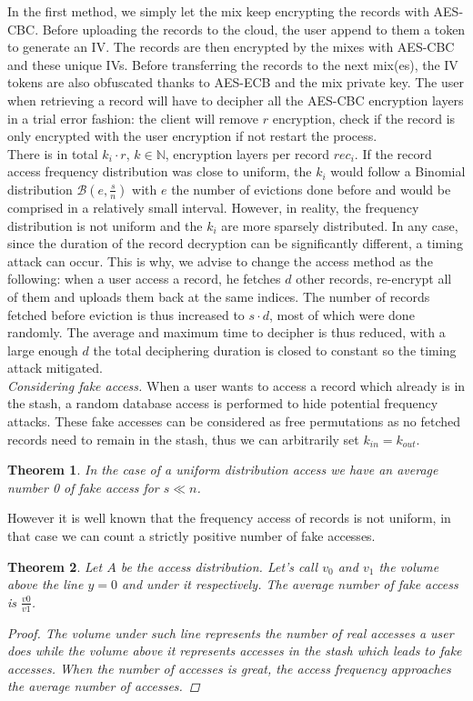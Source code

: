 \documentclass{llncs}
\newtheorem{thm}{Theorem}
\begin{document}
In the first method, we simply let the mix keep encrypting the records with AES-CBC. Before uploading the records to the cloud, the user append to them a token to generate an IV. The records are then encrypted by the mixes with AES-CBC and these unique IVs. Before transferring the records to the next mix(es), the IV tokens are also obfuscated thanks to AES-ECB and the mix private key.
The user when retrieving a record will have to decipher all the AES-CBC encryption layers in a trial error fashion: the client will remove $r$ encryption, check if the record is only encrypted with the user encryption if not restart the process.\\
There is in total $k_i \cdot r$, $k\in \mathbb{N}$, encryption layers per record $rec_i$. If the record access frequency distribution was close to uniform, the $k_i$ would follow a Binomial distribution $\mathcal{B}\left ( e, \frac{s}{n}\right )$ with $e$ the number of evictions done before and would be comprised in a relatively small interval. However, in reality, the frequency distribution is not uniform and the $k_i$ are more sparsely distributed. In any case, since the duration of the record decryption can be significantly different, a timing attack can occur. This is why, we advise to change the access method as the following: when a user access a record, he fetches $d$ other records, re-encrypt all of them and uploads them back at the same indices. The number of records fetched before eviction is thus increased to $s\cdot d$, most of which were done randomly. The average and maximum time to decipher is thus reduced, with a large enough $d$ the total deciphering duration is closed to constant so the timing attack mitigated.\\

\noindent\textit{Considering fake access.} When a user wants to access a record which already is in the stash, a random database access is performed to hide potential frequency attacks. These fake accesses can be considered as free permutations as no fetched records need to remain in the stash, thus we can arbitrarily set $k_{in}=k_{out}$.
%
\begin{thm}
In the case of a uniform distribution access we have an average number 0 of fake access for $s\ll n$.
\end{thm}
%
However it is well known that the frequency access of records is not uniform, in that case we can count a strictly positive number of fake accesses.
\begin{thm}
Let $A$ be the access distribution. Let's call $v_0$ and $v_1$ the volume above the line $y=0$ and under it respectively.
The average number of fake access is $ \frac{v0}{v1}$.
\begin{proof}
The volume under such line represents the number of real accesses a user does while the volume above it represents accesses in the stash which leads to fake accesses.
When the number of accesses is great, the access frequency approaches the average number of accesses.
\end{proof}
\end{thm}
\end{document}

